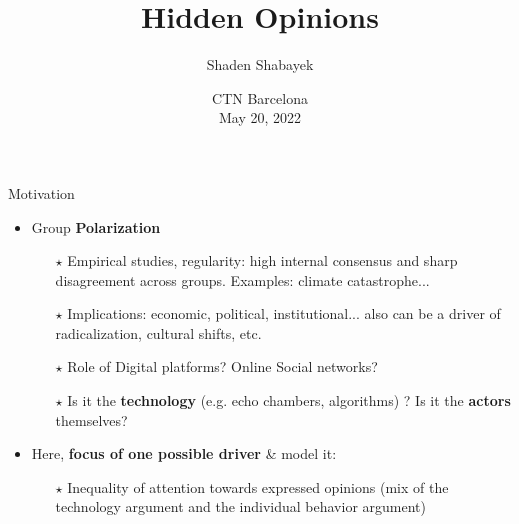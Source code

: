 \documentclass[xcolor=table,handout]{beamer}
\title[Hidden Opinions]{Hidden Opinions}
\author{Shaden Shabayek}
\institute{ Post-doctoral Researcher \\ Sciences Po Medialab}
\date{CTN Barcelona \\ May 20, 2022 }
\makeatletter
\newenvironment{backgroundblock}[2]{%
  \global\setbox\@backgroundblock=\vbox\bgroup%
    \unvbox\@backgroundblock%
    \vbox to0pt\bgroup\vskip#2\hbox to0pt\bgroup\hskip#1\relax%
}{\egroup\egroup\egroup}
\makeatother
\begin{document}
\begin{frame}[noframenumbering]

 \titlepage
 \thispagestyle{empty}
  

\end{frame}

\begin{frame}{Motivation}


\begin{itemize} \setlength\itemsep{1em}
	\item Group {\bf\color{purple}Polarization}   \smallskip 
	
		\begin{itemize} \setlength\itemsep{1em}
			\item[$\star$] Empirical studies, regularity: high internal consensus and sharp disagreement across groups. Examples: climate catastrophe... 
			\item[$\star$] Implications: economic, political, institutional... also can be a driver of radicalization, cultural shifts, etc. 
			\item[$\star$] Role  of Digital platforms? Online Social networks? 
			\item[$\star$] Is it the {\bf\color{purple}technology} (e.g. echo chambers, algorithms) ? Is it the {\bf\color{purple}actors} themselves? 
		\end{itemize}
	\item Here, {\bf\color{purple}focus of one possible driver} \& model it: 
		\begin{itemize} \setlength\itemsep{1em}
			\item[$\star$] Inequality of attention towards expressed opinions  (mix of the technology argument and the individual behavior argument)
		\end{itemize}
\end{itemize}
\end{frame}
\end{document}

